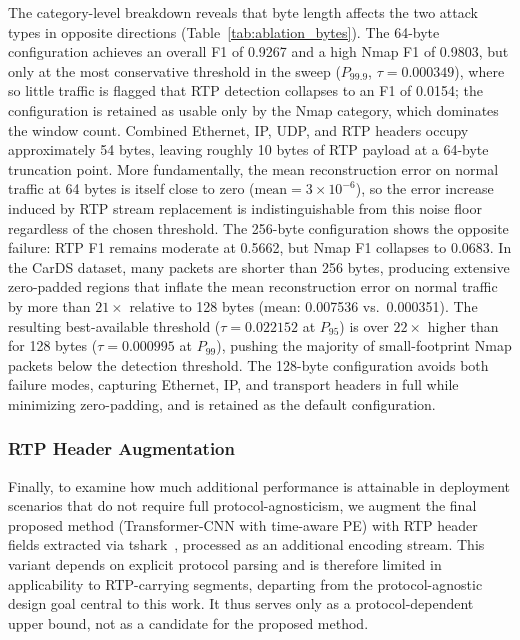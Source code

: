The category-level breakdown reveals that byte length affects the two attack types in opposite directions (Table~\ref{tab:ablation_bytes}). The 64-byte configuration achieves an overall F1 of 0.9267 and a high Nmap F1 of 0.9803, but only at the most conservative threshold in the sweep ($P_{99.9}$, $\tau=0.000349$), where so little traffic is flagged that RTP detection collapses to an F1 of 0.0154; the configuration is retained as usable only by the Nmap category, which dominates the window count. Combined Ethernet, IP, UDP, and RTP headers occupy approximately 54 bytes, leaving roughly 10 bytes of RTP payload at a 64-byte truncation point. More fundamentally, the mean reconstruction error on normal traffic at 64 bytes is itself close to zero ($\text{mean}=3\times10^{-6}$), so the error increase induced by RTP stream replacement is indistinguishable from this noise floor regardless of the chosen threshold. The 256-byte configuration shows the opposite failure: RTP F1 remains moderate at 0.5662, but Nmap F1 collapses to 0.0683. In the CarDS dataset, many packets are shorter than 256 bytes, producing extensive zero-padded regions that inflate the mean reconstruction error on normal traffic by more than $21\times$ relative to 128 bytes (mean: 0.007536 vs.\ 0.000351). The resulting best-available threshold ($\tau=0.022152$ at $P_{95}$) is over $22\times$ higher than for 128 bytes ($\tau=0.000995$ at $P_{99}$), pushing the majority of small-footprint Nmap packets below the detection threshold. The 128-byte configuration avoids both failure modes, capturing Ethernet, IP, and transport headers in full while minimizing zero-padding, and is retained as the default configuration.

\subsubsection{RTP Header Augmentation}
\label{sec:rtpheader_ablation}
Finally, to examine how much additional performance is attainable in deployment scenarios that do not require full protocol-agnosticism, we augment the final proposed method (Transformer-CNN with time-aware PE) with RTP header fields extracted via tshark~\cite{tshark}, processed as an additional encoding stream. This variant depends on explicit protocol parsing and is therefore limited in applicability to RTP-carrying segments, departing from the protocol-agnostic design goal central to this work. It thus serves only as a protocol-dependent upper bound, not as a candidate for the proposed method.

